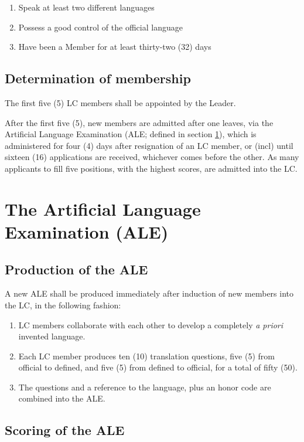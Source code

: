 \documentclass[10pt]{book}
\begin{document}
\begin{enumerate}
 \item Speak at least two different languages
 \item Possess a good control of the official language
 \item Have been a Member for at least thirty-two (32) days
\end{enumerate}

\subsection{Determination of membership}

The first five (5) LC members shall be appointed by the Leader.

After the first five (5), new members are admitted after one leaves, via the Artificial Language Examination (ALE; defined in section \ref{sec:ale}), which is administered for four (4) days after resignation of an LC member, or (incl) until sixteen (16) applications are received, whichever comes before the other. As many applicants to fill five positions, with the highest scores, are admitted into the LC.

\section{The Artificial Language Examination (ALE)}
\label{sec:ale}

\subsection{Production of the ALE}

A new ALE shall be produced immediately after induction of new members into the LC, in the following fashion:

\begin{enumerate}
 \item LC members collaborate with each other to develop a completely \emph{a priori} invented language.
 \item Each LC member produces ten (10) translation questions, five (5) from official to defined, and five (5) from defined to official, for a total of fifty (50).
 \item The questions and a reference to the language, plus an honor code are combined into the ALE.
\end{enumerate}

\subsection{Scoring of the ALE}
\end{document}
